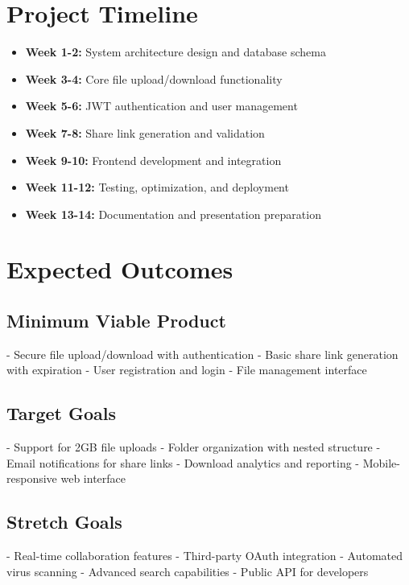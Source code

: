 \documentclass[final]{cvpr}
\begin{document}
\section{Project Timeline}

\begin{itemize}
    \item \textbf{Week 1-2:} System architecture design and database schema
    \item \textbf{Week 3-4:} Core file upload/download functionality
    \item \textbf{Week 5-6:} JWT authentication and user management
    \item \textbf{Week 7-8:} Share link generation and validation
    \item \textbf{Week 9-10:} Frontend development and integration
    \item \textbf{Week 11-12:} Testing, optimization, and deployment
    \item \textbf{Week 13-14:} Documentation and presentation preparation
\end{itemize}

\section{Expected Outcomes}

\subsection{Minimum Viable Product}
- Secure file upload/download with authentication
- Basic share link generation with expiration
- User registration and login
- File management interface

\subsection{Target Goals}
- Support for 2GB file uploads
- Folder organization with nested structure
- Email notifications for share links
- Download analytics and reporting
- Mobile-responsive web interface

\subsection{Stretch Goals}
- Real-time collaboration features
- Third-party OAuth integration
- Automated virus scanning
- Advanced search capabilities
- Public API for developers
\end{document}
